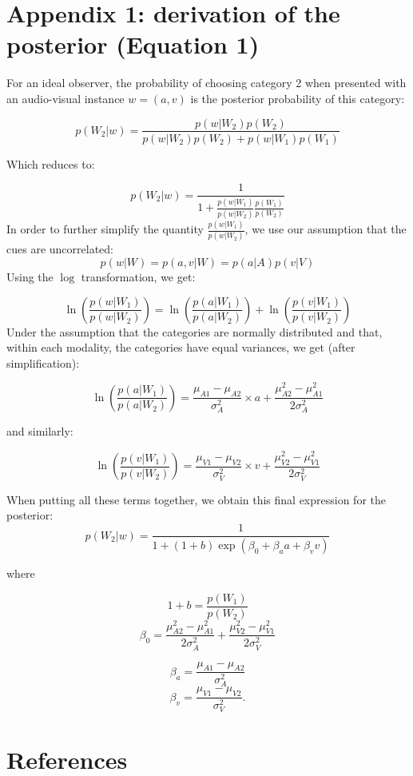 \documentclass[english,floatsintext,man]{apa6}
\theoremstyle{definition}
\theoremstyle{definition}
\theoremstyle{definition}
\theoremstyle{remark}
\begin{document}
\section{Appendix 1: derivation of the posterior (Equation
1)}\label{appendix-1-derivation-of-the-posterior-equation-1}

For an ideal observer, the probability of choosing category 2 when
presented with an audio-visual instance \(w = (a, v)\) is the posterior
probability of this category:

\[p(W_2 | w)=\frac{p(w|W_2)p(W_2)}{p(w|W_2)p(W_2)+p(w|W_1)p(W_1)}\]

Which reduces to:

\[p(W_2 | w)=\frac{1}{1+\frac{p(w|W_1)}{p(w|W_2)} \frac{p(W_1)}{p(W_2)}}\]
In order to further simplify the quantity \(\frac{p(w|W_1)}{p(w|W_2)}\),
we use our assumption that the cues are uncorrelated:
\[p(w | W) = p(a,v| W) = p(a| A)p(v| V)\] Using the \(\log\)
transformation, we get:

\[ \ln(\frac{p(w |W_1)}{p(w|W_2)})=\ln(\frac{p(a|W_1)}{p(a|W_2)})+\ln(\frac{p(v|W_1)}{p(v|W_2)}) \]
Under the assumption that the categories are normally distributed and
that, within each modality, the categories have equal variances, we get
(after simplification):

\[\ln(\frac{p(a|W_1)}{p(a|W_2)})=\frac{\mu_{A1}-\mu_{A2}}{\sigma^2_{A}}\times a+ \frac{\mu^2_{A2}-\mu^2_{A1}}{2\sigma^2_{A}}\]

and similarly:

\[\ln(\frac{p(v|W_1)}{p(v|W_2)})=\frac{\mu_{V1}-\mu_{V2}}{\sigma^2_{V}}\times v+ \frac{\mu^2_{V2}-\mu^2_{V1}}{2\sigma^2_{V}}\]

When putting all these terms together, we obtain this final expression
for the posterior:
\[p(W_2 | w)=\frac{1}{1+(1+b)\exp(\beta_0+\beta_aa+\beta_vv)}\]

where

\[1+b=\frac{p(W_1)}{p(W_2)}\]
\[\beta_0=\frac{\mu^2_{A2}-\mu^2_{A1}}{2\sigma^2_{A}}+\frac{\mu^2_{V2}-\mu^2_{V1}}{2\sigma^2_{V}}\]

\[\beta_a=\frac{\mu_{A1}-\mu_{A2}}{\sigma^2_{A}}\]
\[\beta_v=\frac{\mu_{V1}-\mu_{V2}}{\sigma^2_{V}}.\]

\section{References}\label{references}

\setlength{\parindent}{-0.5in} \setlength{\leftskip}{0.5in}
\end{document}
